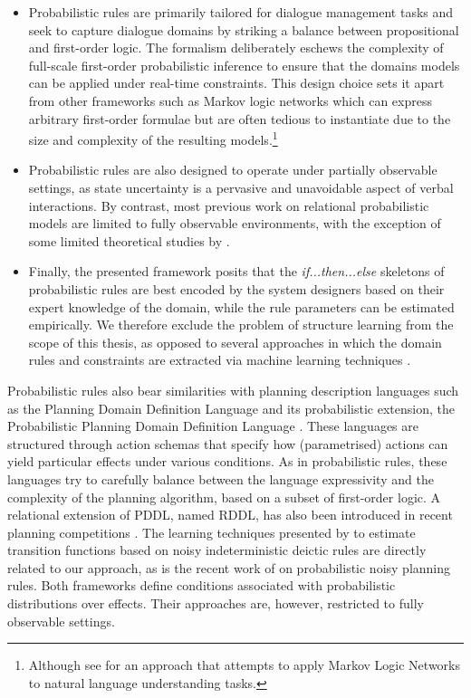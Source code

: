 \begin{itemize}

\item Probabilistic rules are primarily tailored for dialogue management tasks and seek to capture dialogue domains by striking a balance between propositional and first-order logic. The formalism deliberately eschews the complexity of full-scale first-order probabilistic inference to ensure that the domains models can be applied under real-time constraints. This design choice sets it apart from other frameworks such as Markov logic networks which can express arbitrary first-order formulae but are often tedious to instantiate due to the size and complexity of the resulting models.\footnote{Although see \cite{Kennington:2012} for an approach that attempts to apply Markov Logic Networks to natural language understanding tasks.} 

\item Probabilistic rules are also designed to operate under partially observable settings, as state uncertainty is a pervasive and unavoidable aspect of verbal interactions.  By contrast, most previous work on relational probabilistic models are limited to fully observable environments, with the exception of some limited theoretical studies by \cite{Wang:2010,SannerK10}. 

\item Finally, the presented framework posits that the \textit{if...then...else} skeletons of probabilistic rules are best encoded by the system designers based on their expert knowledge of the domain, while the rule parameters can be estimated empirically. We therefore exclude the problem of structure learning from the scope of this thesis, as opposed to several approaches in which the domain rules and constraints are extracted via machine learning techniques \citep{PasulaZK07,Kok:2009}.

\end{itemize}

Probabilistic rules also bear similarities with planning description languages such as the Planning Domain Definition Language \citep[PDDL, see ][]{mcdermott1998} and its probabilistic extension, the Probabilistic Planning Domain Definition Language \citep[PPDDL, see ][]{younes2004ppddl1}.  These languages are structured through action schemas that specify how (parametrised) actions can yield particular effects under various conditions. As in probabilistic rules, these languages try to carefully balance between the language expressivity and the complexity of the planning algorithm, based on a subset of first-order logic. A relational extension of PDDL, named RDDL, has also been introduced in recent planning competitions \citep{Sanner:RDDL}. The learning techniques presented by \cite{PasulaZK07} to estimate transition functions based on noisy indeterministic deictic rules are directly related to our approach, as is the recent work of \cite{lang10jair} on probabilistic noisy planning rules.   Both frameworks define conditions associated with probabilistic distributions over effects. Their approaches are, however, restricted to fully observable settings. 


